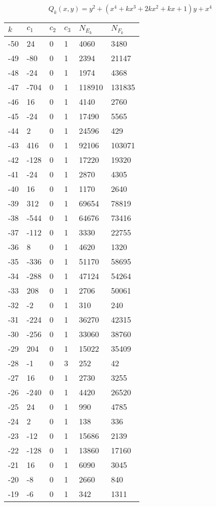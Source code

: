 \documentclass{amsart}
\begin{document}
\clearpage
$$Q_k(x,y)=y^2 + (x^4 + kx^3 + 2kx^2 + kx + 1)y + x^4$$
\begin{longtable}{llllll}
\hline
$k$ & $c_1$ & $c_2$ & $c_3$ & $N_{E_k}$ & $N_{F_k}$\\
\hline
-50 & 24 & 0 & 1 & 4060 & 3480\\
-49 & -80 & 0 & 1 & 2394 & 21147\\
-48 & -24 & 0 & 1 & 1974 & 4368\\
-47 & -704 & 0 & 1 & 118910 & 131835\\
-46 & 16 & 0 & 1 & 4140 & 2760\\
-45 & -24 & 0 & 1 & 17490 & 5565\\
-44 & 2 & 0 & 1 & 24596 & 429\\
-43 & 416 & 0 & 1 & 92106 & 103071\\
-42 & -128 & 0 & 1 & 17220 & 19320\\
-41 & -24 & 0 & 1 & 2870 & 4305\\
-40 & 16 & 0 & 1 & 1170 & 2640\\
-39 & 312 & 0 & 1 & 69654 & 78819\\
-38 & -544 & 0 & 1 & 64676 & 73416\\
-37 & -112 & 0 & 1 & 3330 & 22755\\
-36 & 8 & 0 & 1 & 4620 & 1320\\
-35 & -336 & 0 & 1 & 51170 & 58695\\
-34 & -288 & 0 & 1 & 47124 & 54264\\
-33 & 208 & 0 & 1 & 2706 & 50061\\
-32 & -2 & 0 & 1 & 310 & 240\\
-31 & -224 & 0 & 1 & 36270 & 42315\\
-30 & -256 & 0 & 1 & 33060 & 38760\\
-29 & 204 & 0 & 1 & 15022 & 35409\\
-28 & -1 & 0 & 3 & 252 & 42\\
-27 & 16 & 0 & 1 & 2730 & 3255\\
-26 & -240 & 0 & 1 & 4420 & 26520\\
-25 & 24 & 0 & 1 & 990 & 4785\\
-24 & 2 & 0 & 1 & 138 & 336\\
-23 & -12 & 0 & 1 & 15686 & 2139\\
-22 & -128 & 0 & 1 & 13860 & 17160\\
-21 & 16 & 0 & 1 & 6090 & 3045\\
-20 & -8 & 0 & 1 & 2660 & 840\\
-19 & -6 & 0 & 1 & 342 & 1311\\

\end{longtable}
\end{document}

